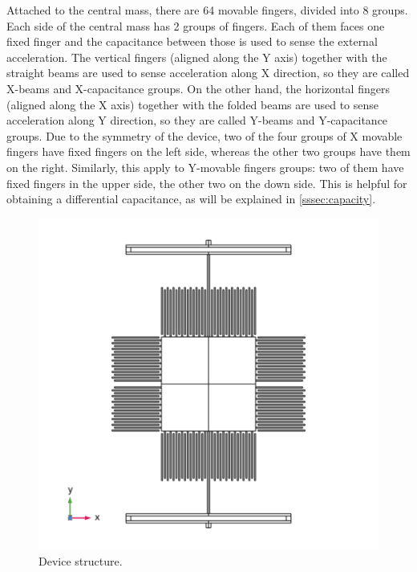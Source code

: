 \documentclass[lettersize,journal]{IEEEtran}
\begin{document}
        Attached to the central mass, there are 64 movable fingers, divided into 8 groups. Each side of the central mass has 2 groups of fingers. Each of them faces one fixed finger and the capacitance between those is used to sense the external acceleration. The vertical fingers (aligned along the Y axis) together with the straight beams are used to sense acceleration along X direction, so they are called X-beams and X-capacitance groups. On the other hand, the horizontal fingers (aligned along the X axis) together with the folded beams are used to sense acceleration along Y direction, so they are called Y-beams and Y-capacitance groups. Due to the symmetry of the device, two of the four groups of X movable fingers have fixed fingers on the left side, whereas the other two groups have them on the right. Similarly, this apply to Y-movable fingers groups: two of them have fixed fingers in the upper side, the other two on the down side. This is helpful for obtaining a differential capacitance, as will be explained in \ref{sssec:capacity}.
        
        
        \begin{figure}[h!]
            \centering
            \includegraphics[width=1.0\linewidth]{full_device_geometry.png}
            \caption{Device structure.}
            \label{fig:dev-struct}
        \end{figure}
        
\end{document}
